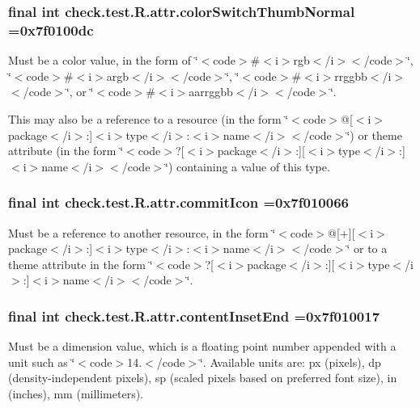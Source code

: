 \subsubsection[{color\+Switch\+Thumb\+Normal}]{\setlength{\rightskip}{0pt plus 5cm}final int check.\+test.\+R.\+attr.\+color\+Switch\+Thumb\+Normal =0x7f0100dc\hspace{0.3cm}{\ttfamily [static]}}\label{classcheck_1_1test_1_1_r_1_1attr_a97c7cb59a0e732bdf75408a5029196c7}
Must be a color value, in the form of \char`\"{}$<$code$>$\#$<$i$>$rgb$<$/i$>$$<$/code$>$\char`\"{}, \char`\"{}$<$code$>$\#$<$i$>$argb$<$/i$>$$<$/code$>$\char`\"{}, \char`\"{}$<$code$>$\#$<$i$>$rrggbb$<$/i$>$$<$/code$>$\char`\"{}, or \char`\"{}$<$code$>$\#$<$i$>$aarrggbb$<$/i$>$$<$/code$>$\char`\"{}. 

This may also be a reference to a resource (in the form \char`\"{}$<$code$>$@\mbox{[}$<$i$>$package$<$/i$>$\+:\mbox{]}$<$i$>$type$<$/i$>$\+:$<$i$>$name$<$/i$>$$<$/code$>$\char`\"{}) or theme attribute (in the form \char`\"{}$<$code$>$?\mbox{[}$<$i$>$package$<$/i$>$\+:\mbox{]}\mbox{[}$<$i$>$type$<$/i$>$\+:\mbox{]}$<$i$>$name$<$/i$>$$<$/code$>$\char`\"{}) containing a value of this type. \hypertarget{classcheck_1_1test_1_1_r_1_1attr_a862aaa7d2b544ac9dac2c49d10089fa0}{}
\subsubsection[{commit\+Icon}]{\setlength{\rightskip}{0pt plus 5cm}final int check.\+test.\+R.\+attr.\+commit\+Icon =0x7f010066\hspace{0.3cm}{\ttfamily [static]}}\label{classcheck_1_1test_1_1_r_1_1attr_a862aaa7d2b544ac9dac2c49d10089fa0}
Must be a reference to another resource, in the form \char`\"{}$<$code$>$@\mbox{[}+\mbox{]}\mbox{[}$<$i$>$package$<$/i$>$\+:\mbox{]}$<$i$>$type$<$/i$>$\+:$<$i$>$name$<$/i$>$$<$/code$>$\char`\"{} or to a theme attribute in the form \char`\"{}$<$code$>$?\mbox{[}$<$i$>$package$<$/i$>$\+:\mbox{]}\mbox{[}$<$i$>$type$<$/i$>$\+:\mbox{]}$<$i$>$name$<$/i$>$$<$/code$>$\char`\"{}. \hypertarget{classcheck_1_1test_1_1_r_1_1attr_ae54701e7140ba2c59574741d9e6cde46}{}
\subsubsection[{content\+Inset\+End}]{\setlength{\rightskip}{0pt plus 5cm}final int check.\+test.\+R.\+attr.\+content\+Inset\+End =0x7f010017\hspace{0.3cm}{\ttfamily [static]}}\label{classcheck_1_1test_1_1_r_1_1attr_ae54701e7140ba2c59574741d9e6cde46}
Must be a dimension value, which is a floating point number appended with a unit such as \char`\"{}$<$code$>$14.\+5sp$<$/code$>$\char`\"{}. Available units are\+: px (pixels), dp (density-\/independent pixels), sp (scaled pixels based on preferred font size), in (inches), mm (millimeters). 

